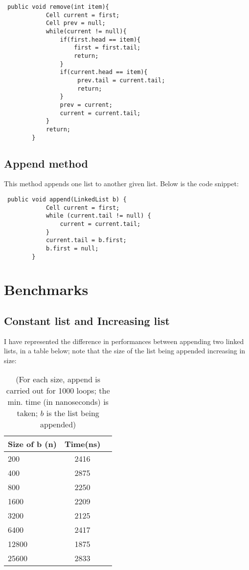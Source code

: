 \documentclass[a4paper,11pt]{article}
\begin{document}
\begin{verbatim}
 public void remove(int item){
            Cell current = first;
            Cell prev = null;
            while(current != null){
                if(first.head == item){
                    first = first.tail;
                    return;
                }
                if(current.head == item){
                     prev.tail = current.tail;
                     return;
                }
                prev = current;
                current = current.tail;
            }
            return;
        }
\end{verbatim}

\subsection*{Append method}

This method appends one list to another given list. Below is the code snippet:

\begin{verbatim}
 public void append(LinkedList b) {
            Cell current = first;
            while (current.tail != null) {
                current = current.tail;
            }
            current.tail = b.first;
            b.first = null;
        }
\end{verbatim}

\section*{Benchmarks}

\subsection*{Constant list and Increasing list}

I have represented the difference in performances between appending two linked lists, in a table below; note that the size of the list being appended increasing in size:

\begin{table}[h]
\begin{center}
\begin{tabular}{l|c|c}
\textbf{Size of b (n)} & \textbf{Time(ns)}\\
\hline
  200      &  2416 \\
  400      &  2875\\
  800      &  2250\\
  1600      &  2209\\
  3200      &  2125 \\
  6400      &  2417\\
  12800      &  1875\\
  25600      &  2833\\
\end{tabular}
\caption{(For each size, append is carried out for 1000 loops; the min. time (in nanoseconds) is taken; $b$ is the list being appended)}
\label{tab:table1}
\end{center}
\end{table}
\end{document}
